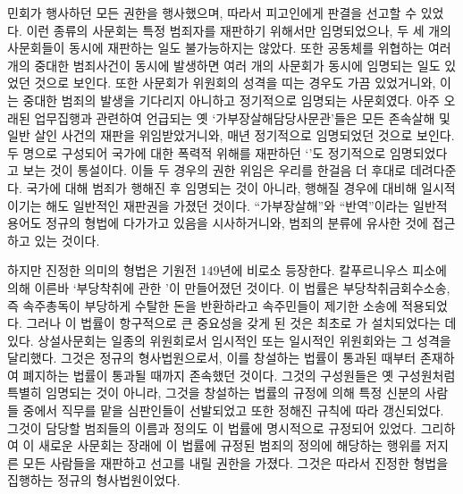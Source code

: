 민회가 행사하던 모든 권한을 행사했으며,
따라서 피고인에게 판결을 선고할 수 있었다.
이런 종류의 사문회는
특정 범죄자를 재판하기 위해서만 임명되었으나,
두 세 개의 사문회들이 동시에 재판하는 일도 불가능하지는 않았다.
또한
공동체를 위협하는 여러 개의 중대한 범죄사건이 동시에 발생하면
여러 개의 사문회가 동시에 임명되는 일도 있었던 것으로 보인다.
또한 사문회가
위원회의 성격을 띠는 경우도 가끔 있었거니와,
이는 중대한 범죄의 발생을 기다리지 아니하고
정기적으로 임명되는 사문회였다.
아주 오래된 업무집행과 관련하여 언급되는
%
옛 `가부장살해담당사문관'들은
모든 존속살해 및 일반 살인 사건의
재판을
위임받았거니와,
매년 정기적으로 임명되었던 것으로 보인다.
두 명으로 구성되어
국가에 대한 폭력적 위해를 재판하던
`'도
정기적으로 임명되었다고 보는 것이 통설이다.
이들 두 경우의 권한 위임은 우리를 한걸음 더 후대로 데려다준다.
국가에 대해 범죄가  행해진 후 임명되는 것이 아니라,
 행해질 경우에 대비해
일시적이기는 해도 일반적인 재판권을 가졌던 것이다.
``가부장살해''와
``반역''이라는 일반적 용어도
정규의 형법에 다가가고 있음을 시사하거니와,
범죄의 분류에 유사한 것에 접근하고 있는 것이다.

하지만 진정한 의미의 형법은 기원전 149년에 비로소 등장한다.
칼푸르니우스 피소에 의해
이른바
`부당착취에 관한 '이
만들어졌던 것이다.
이 법률은 부당착취금회수소송,
즉 속주총독이 부당하게 수탈한 돈을 반환하라고 속주민들이 제기한
소송에 적용되었다.
그러나 이 법률이 항구적으로 큰 중요성을 갖게 된 것은
최초로 가 설치되었다는 데 있다.
상설사문회는 일종의 위원회로서
임시적인 또는 일시적인 위원회와는 그 성격을 달리했다.
그것은 정규의 형사법원으로서,
이를 창설하는 법률이 통과된 때부터 존재하여
폐지하는 법률이 통과될 때까지 존속했던 것이다.
그것의 구성원들은
옛  구성원처럼 특별히 임명되는 것이 아니라,
그것을 창설하는 법률의 규정에 의해
특정 신분의 사람들 중에서 직무를 맡을 심판인들이 선발되었고
또한 정해진 규칙에 따라 갱신되었다.
그것이 담당할 범죄들의 이름과 정의도
이 법률에
명시적으로 규정되어 있었다.
그리하여 이 새로운 사문회는
장래에
이 법률에 규정된 범죄의 정의에 해당하는 행위를 저지른
모든 사람들을 재판하고 선고를 내릴 권한을 가졌다.
그것은 따라서
진정한 형법을 집행하는
정규의 형사법원이었다.

